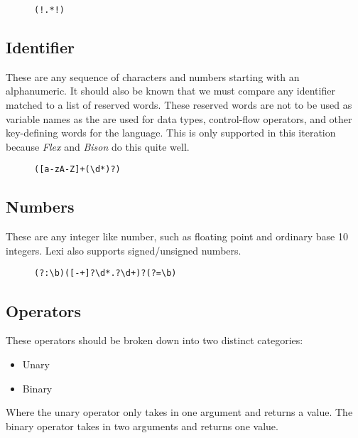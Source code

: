 \documentclass{article}
\begin{document}
\begin{figure}[!htpb]
\centering
\begin{Verbatim}[frame=single]
(!.*!)
\end{Verbatim}
\end{figure}

\newpage


\subsection{Identifier}

These are any sequence of characters and numbers starting with an alphanumeric.
It should also be known that we must compare any identifier matched to a list of reserved words.
These reserved words are not to be used as variable names as the are used for data types, control-flow operators, and other key-defining words for the language.
This is only supported in this iteration because \emph{Flex} and \emph{Bison} do this quite well.

\begin{figure}[!htpb]
\centering
\begin{Verbatim}[frame=single]
([a-zA-Z]+(\d*)?)
\end{Verbatim}
\end{figure}

\subsection{Numbers}

These are any integer like number, such as floating point and ordinary base 10 integers.
Lexi also supports signed/unsigned numbers.

\begin{figure}[!htpb]
\centering
\begin{Verbatim}[frame=single]
(?:\b)([-+]?\d*.?\d+)?(?=\b)
\end{Verbatim}
\end{figure}


\subsection{Operators}

\begin{flushleft}

These operators should be broken down into two distinct categories:
\begin{itemize}
\item Unary
\item Binary
\end{itemize}

Where the unary operator only takes in one argument and returns a value.
The binary operator takes in two arguments and returns one value.
\end{flushleft}
\end{document}
